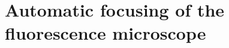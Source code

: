 \appendix
\chapter{Automatic focusing of the fluorescence microscope}
\label{app:A}

\renewcommand\thesection{\Alph{chapter}.\arabic{section}}
\setcounter{section}{0}
\renewcommand{\thefigure}{A.\arabic{figure}}
\setcounter{figure}{0}




\printbibliography[title={References}]

